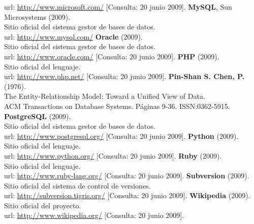 \begin{thebibliography}{xx}
         url: \url{http://www.microsoft.com/}
         [Consulta: 20 junio 2009].
 \textbf{MySQL}, Sun Microsystems (2009).\\
         Sitio oficial del sistema gestor de bases de datos.\\
         url: \url{http://www.mysql.com/}
 \textbf{Oracle} (2009).\\
         Sitio oficial del sistema gestor de bases de datos.\\
         url: \url{http://www.oracle.com/}
         [Consulta: 20 junio 2009].
 \textbf{PHP} (2009).\\
         Sitio oficial del lenguaje.\\
         url: \url{http://www.php.net/}
         [Consulta: 20 junio 2009].
 \textbf{Pin-Shan S. Chen, P.} (1976).\\
         The Entity-Relationship Model: Toward a Unified View of Data. \\
         ACM Transactions on Database Systems. Páginas 9-36.
         ISSN:0362-5915.
 \textbf{PostgreSQL} (2009).\\
         Sitio oficial del sistema gestor de bases de datos.\\
         url: \url{http://www.postgresql.org/}
         [Consulta: 20 junio 2009].
 \textbf{Python} (2009).\\
         Sitio oficial del lenguaje.\\
         url: \url{http://www.python.org/}
         [Consulta: 20 junio 2009].
 \textbf{Ruby} (2009).\\
         Sitio oficial del lenguaje.\\
         url: \url{http://www.ruby-lang.org/}
         [Consulta: 20 junio 2009].
 \textbf{Subversion} (2009).\\
         Sitio oficial del sistema de control de versiones.\\
         url: \url{http://subversion.tigris.org/}
         [Consulta: 20 junio 2009].
 \textbf{Wikipedia} (2009).\\
         Sitio oficial del proyecto.\\
         url: \url{http://www.wikipedia.org/}
         [Consulta: 20 junio 2009].
 \end{thebibliography}
